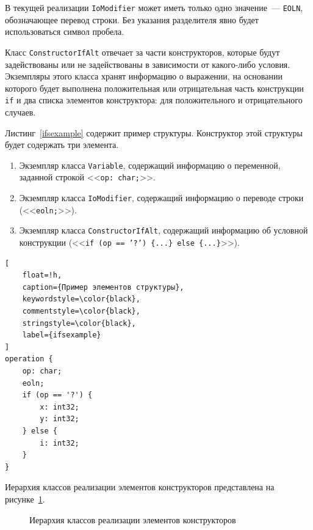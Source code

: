 \documentclass[times,specification,annotation]{style/itmo-student-thesis/itmo-student-thesis}
\begin{document}
В текущей реализации \texttt{IoModifier} может иметь только одно значение~--- \texttt{EOLN}, обозначающее перевод строки. Без указания разделителя явно будет использоваться символ пробела.

Класс \texttt{ConstructorIfAlt} отвечает за части конструкторов, которые будут задействованы или не задействованы в зависимости от какого-либо условия. Экземпляры этого класса хранят информацию о выражении, на основании которого будет выполнена положительная или отрицательная часть конструкции \texttt{if} и два списка элементов конструктора: для положительного и отрицательного случаев.

Листинг~\ref{ifsexample} содержит пример структуры. Конструктор этой структуры будет содержать три элемента.

\begin{enumerate}[leftmargin=1.75cm]
    \item Экземпляр класса \texttt{Variable}, содержащий информацию о переменной, заданной строкой <<\texttt{op: char;}>>.
    \item Экземпляр класса \texttt{IoModifier}, содержащий информацию о переводе строки (<<\texttt{eoln;}>>).
    \item Экземпляр класса \texttt{ConstructorIfAlt}, содержащий информацию об условной конструкции (<<\texttt{if (op == '?') \{...\} else \{...\}}>>).
\end{enumerate}

\begin{lstlisting}[
    float=!h,
    caption={Пример элементов структуры},
    keywordstyle=\color{black},
    commentstyle=\color{black},
    stringstyle=\color{black},
    label={ifsexample}
]
operation {
    op: char;
    eoln;
    if (op == '?') {
        x: int32;
        y: int32;
    } else {
        i: int32;
    }
}
\end{lstlisting}

Иерархия классов реализации элементов конструкторов представлена на рисунке~\ref{constructor-items-classes-hierarchy}.

\begin{figure}[!h]
\caption{Иерархия классов реализации элементов конструкторов}\label{constructor-items-classes-hierarchy}
\centering
{}%

\end{figure}
\end{document}
